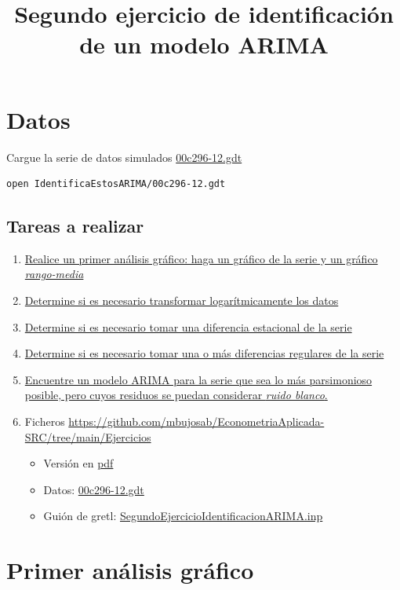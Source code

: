 \documentclass[10pt]{article}
\date{}
\title{Segundo ejercicio de identificación de un modelo ARIMA}
\begin{document}
\maketitle
\section*{Datos}
\label{sec:orgfd684ad}

Cargue la serie de datos simulados \href{IdentificaEstosARIMA/00c296-12.gdt}{00c296-12.gdt}

\begin{verbatim}
open IdentificaEstosARIMA/00c296-12.gdt
\end{verbatim}
\subsection*{Tareas a realizar}
\label{sec:org29a5943}
\begin{enumerate}
\item \hyperref[sec:org798aa3c]{Realice un primer análisis gráfico: haga
un gráfico de la serie y un gráfico \emph{rango-media}}
\item \hyperref[sec:org2f997d4]{Determine si es necesario transformar logarítmicamente los datos}
\item \hyperref[sec:org3beacc4]{Determine si es necesario tomar una
diferencia estacional de la serie}
\item \hyperref[sec:org7695fc3]{Determine si es necesario tomar una o
más diferencias regulares de la serie}
\item \hyperref[sec:orgd2947b1]{Encuentre un modelo ARIMA para la
serie que sea lo más parsimonioso posible, pero cuyos residuos se
puedan considerar \emph{ruido blanco}.}

\item Ficheros \url{https://github.com/mbujosab/EconometriaAplicada-SRC/tree/main/Ejercicios}
\begin{itemize}
\item Versión en \href{SegundoEjercicioIdentificacionARIMA.pdf}{pdf}
\item Datos:  \href{IdentificaEstosARIMA/00c296-12.gdt}{00c296-12.gdt}
\item Guión de gretl: \url{SegundoEjercicioIdentificacionARIMA.inp}
\end{itemize}
\end{enumerate}
\section*{Primer análisis gráfico}
\label{sec:org798aa3c}
\end{document}
